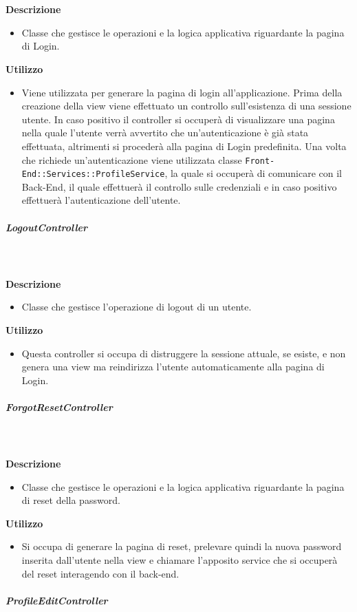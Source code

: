        \textbf{\\ \\ Descrizione} 
          \begin{itemize}
            \item[] Classe che gestisce le operazioni e la logica applicativa riguardante la pagina di Login.
          \end{itemize}      
        \textbf{Utilizzo}  
          \begin{itemize}
            \item[] Viene utilizzata per generare la pagina di login all'applicazione. Prima della creazione della view viene effettuato un controllo sull'esistenza di una sessione utente. In caso positivo il controller si occuperà di visualizzare una pagina nella quale l'utente verrà avvertito che un'autenticazione è già stata effettuata, altrimenti si procederà alla pagina di Login predefinita. Una volta che richiede un'autenticazione viene utilizzata classe \texttt{Front-End::Services::ProfileService}, la quale si occuperà di comunicare con il Back-End, il quale effettuerà il controllo sulle credenziali e in caso positivo effettuerà l'autenticazione dell'utente.
          \end{itemize}
      \subparagraph{LogoutController}
        
        \textbf{\\ \\ Descrizione} 
          \begin{itemize}
            \item[] Classe che gestisce l'operazione di logout di un utente.
          \end{itemize}      
        \textbf{Utilizzo}  
          \begin{itemize}
            \item[] Questa controller si occupa di distruggere la sessione attuale, se esiste, e non genera una view ma reindirizza l'utente automaticamente alla pagina di Login.
          \end{itemize}
      \subparagraph{ForgotResetController}
        
        \textbf{\\ \\ Descrizione} 
          \begin{itemize}
            \item[] Classe che gestisce le operazioni e la logica applicativa riguardante la pagina di reset della password.
          \end{itemize}      
        \textbf{Utilizzo}  
          \begin{itemize}
            \item[] Si occupa di generare la pagina di reset, prelevare quindi la nuova password inserita dall'utente nella view e chiamare l'apposito service che si occuperà del reset interagendo con il back-end.
          \end{itemize}
      \subparagraph{ProfileEditController}
        
